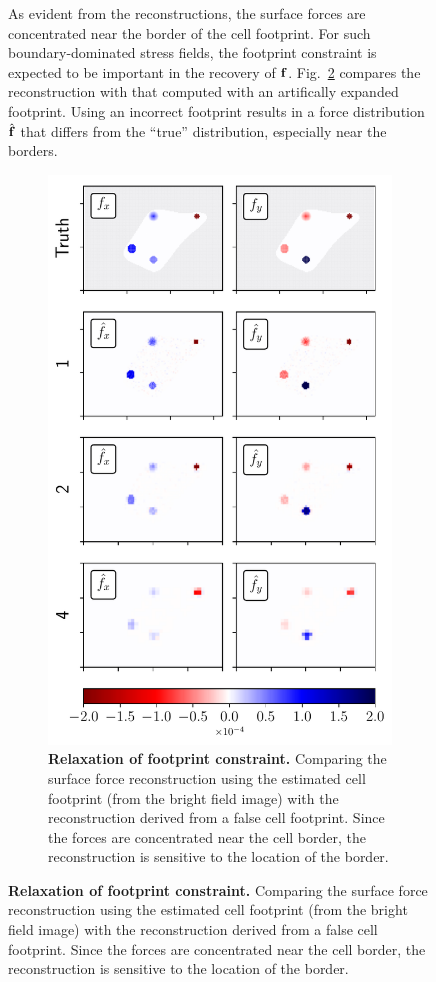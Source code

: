 \documentclass[aps,prl,reprint,twocolumn,groupedaddress,showpacs]{revtex4}
\def\f{{\bf f}}
\begin{document}
\begin{figure}
As evident from the reconstructions, the surface forces are
concentrated near the border of the cell footprint. For such
boundary-dominated stress fields, the footprint constraint is expected
to be important in the recovery of $\f$. Fig.~\ref{DATA3} compares the
reconstruction with that computed with an artifically expanded
footprint. Using an incorrect footprint results in a force
distribution $\hat{\f}$ that differs from the ``true'' distribution,
especially near the borders.
\begin{figure}
\includegraphics[width=\linewidth]{fig4}
\caption{\textbf{Relaxation of footprint constraint.} Comparing the
  surface force reconstruction using the estimated cell footprint
  (from the bright field image) with the reconstruction derived from a
  false cell footprint. Since the forces are concentrated near the
  cell border, the reconstruction is sensitive to the location of the
  border.}
\label{DATA3}
\end{figure}


\end{figure}
\end{document}
